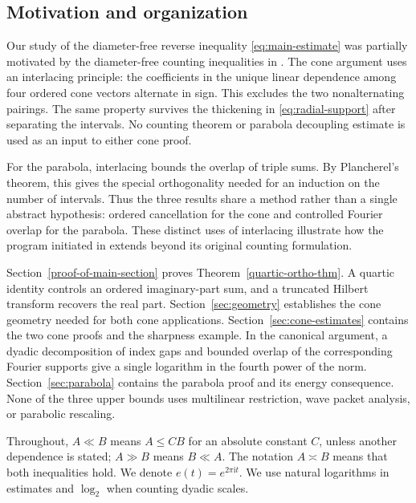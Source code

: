 \documentclass{amsart}
\numberwithin{equation}{section}
\begin{document}
\bigskip 

\subsection{Motivation and organization}

Our study of the diameter-free reverse inequality
\eqref{eq:main-estimate} was partially motivated by the diameter-free counting inequalities in \cite{Cushman-Demeter-Wu}. 
The cone argument uses an interlacing principle: the coefficients in the unique linear dependence among four ordered cone vectors alternate in sign. 
This excludes the two nonalternating pairings. 
The same property survives the thickening in \eqref{eq:radial-support} after separating the intervals. 
No counting theorem or parabola decoupling estimate is used as an input to either cone proof.

For the parabola, interlacing bounds the overlap of triple sums.
By Plancherel's theorem, this gives the special orthogonality needed for an induction on the number of intervals. 
Thus the three results share a method rather than a single abstract hypothesis: ordered cancellation for the cone and controlled Fourier overlap for the parabola. 
These distinct uses of interlacing illustrate how the program initiated in  \cite{Cushman-Demeter-Wu} extends beyond its original counting formulation.

\smallskip 

Section~\ref{proof-of-main-section} proves Theorem~\ref{quartic-ortho-thm}. 
A quartic identity controls an ordered imaginary-part sum, and a truncated Hilbert transform recovers the real part. 
Section~\ref{sec:geometry} establishes the cone geometry needed for both cone applications.
Section~\ref{sec:cone-estimates} contains the two cone proofs and the sharpness example. 
In the canonical argument, a dyadic decomposition of index gaps and bounded overlap of the corresponding Fourier supports give a single logarithm in the fourth power of the norm. 
Section~\ref{sec:parabola} contains the parabola proof and its energy consequence. 
None of the three upper bounds uses multilinear restriction, wave packet analysis, or parabolic rescaling.

\smallskip 

Throughout, $A\ll B$ means $A\leq CB$ for an absolute constant $C$, unless another dependence is stated; $A\gg B$ means $B\ll A$.
The notation $A\asymp B$ means that both inequalities hold.
We denote $e(t)=e^{2\pi\mathrm{i}t}$.
We use natural logarithms in estimates and $\log_2$ when counting dyadic scales.
\end{document}
